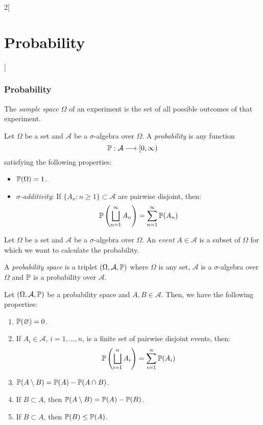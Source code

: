 \documentclass[../../../main_math.tex]{subfiles}
\begin{document}
\begin{multicols}{2}[\section{Probability}]
  \subsubsection{Probability}
  \begin{definition}
    The \emph{sample space} $\Omega$ of an experiment is the set of all possible outcomes of that experiment.
  \end{definition}
  \begin{definition}
    Let $\Omega$ be a set and $\mathcal{A}$ be a $\sigma$-algebra over $\Omega$. A \emph{probability} is any function $$\mathbb{P}:\mathcal{A}\longrightarrow[0,\infty)$$ satisfying the following properties:
    \begin{itemize}
      \item $\mathbb{P}(\Omega)=1$.
      \item \emph{$\sigma$-additivity}: If $\{A_n:n\geq1\}\subset\mathcal{A}$ are pairwise disjoint, then: $$\mathbb{P}\left(\bigsqcup_{n=1}^\infty A_n\right)=\sum_{n=1}^\infty \mathbb{P}(A_n)$$
    \end{itemize}
  \end{definition}
  \begin{definition}
    Let $\Omega$ be a set and $\mathcal{A}$ be a $\sigma$-algebra over $\Omega$. An \emph{event} $A\in\mathcal{A}$ is a subset of $\Omega$ for which we want to calculate the probability.
  \end{definition}
  \begin{definition}
    A \emph{probability space} is a triplet $(\Omega,\mathcal{A},\mathbb{P})$ where $\Omega$ is any set, $\mathcal{A}$ is a $\sigma$-algebra over $\Omega$ and $\mathbb{P}$ is a probability over $\mathcal{A}$.
  \end{definition}
  \begin{proposition}
    Let $(\Omega,\mathcal{A},\mathbb{P})$ be a probability space and $A,B\in\mathcal{A}$. Then, we have the following properties:
    \begin{enumerate}
      \item $\mathbb{P}(\varnothing)=0$.
      \item If $A_i\in\mathcal{A}$, $i=1,\ldots,n$, is a finite set of pairwise disjoint events, then: $$\mathbb{P}\left(\bigsqcup_{i=1}^n A_i\right)=\sum_{i=1}^n \mathbb{P}(A_i)$$
      \item $\mathbb{P}(A\setminus B) =\mathbb{P}(A)-\mathbb{P}(A\cap B)$.
      \item If $B\subset A$, then $\mathbb{P}(A\setminus B)=\mathbb{P}(A)-\mathbb{P}(B)$.
      \item If $B\subset A$, then $\mathbb{P}(B)\leq \mathbb{P}(A)$.

\end{enumerate}
\end{proposition}
\end{multicols}
\end{document}
